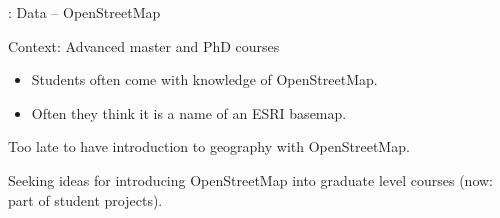 \documentclass[xcolor={dvipsnames,usenames},beamer,aspectratio=169]{beamer}
\begin{document}
\begin{frame}{\geoforalllab: Data -- OpenStreetMap}

\begin{flushright}
Context: Advanced master and PhD courses
\end{flushright}

\begin{itemize}
 \item Students often come with knowledge of OpenStreetMap.
 \item Often they think it is a name of an ESRI basemap.
\end{itemize}

Too late to have introduction to geography
with OpenStreetMap.

Seeking ideas for introducing OpenStreetMap into graduate level courses
(now: part of student projects).

\end{frame}
\end{document}

